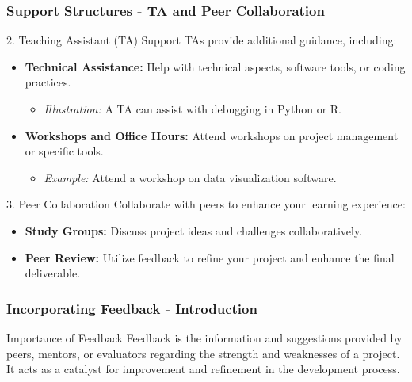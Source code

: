 \documentclass[aspectratio=169]{beamer}
\begin{document}
\begin{frame}[fragile]
    \frametitle{Support Structures - TA and Peer Collaboration}
    \begin{block}{2. Teaching Assistant (TA) Support}
        TAs provide additional guidance, including:
        \begin{itemize}
            \item \textbf{Technical Assistance:}
                Help with technical aspects, software tools, or coding practices.
                \begin{itemize}
                    \item \textit{Illustration:} A TA can assist with debugging in Python or R.
                \end{itemize}
            \item \textbf{Workshops and Office Hours:}
                Attend workshops on project management or specific tools.
                \begin{itemize}
                    \item \textit{Example:} Attend a workshop on data visualization software.
                \end{itemize}
        \end{itemize}
    \end{block}

    \begin{block}{3. Peer Collaboration}
        Collaborate with peers to enhance your learning experience:
        \begin{itemize}
            \item \textbf{Study Groups:} Discuss project ideas and challenges collaboratively.
            \item \textbf{Peer Review:} Utilize feedback to refine your project and enhance the final deliverable.
        \end{itemize}
    \end{block}
\end{frame}

\begin{frame}[fragile]
  \frametitle{Incorporating Feedback - Introduction}
  \begin{block}{Importance of Feedback}
    Feedback is the information and suggestions provided by peers, mentors, or evaluators regarding the strength and weaknesses of a project. It acts as a catalyst for improvement and refinement in the development process.
  \end{block}
\end{frame}
\end{document}
